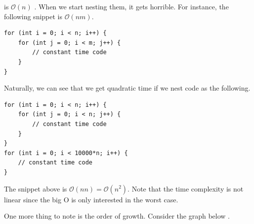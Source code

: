 \documentclass[../../../main.tex]{subfiles}
\begin{document}
is $\mathcal{O}(n)$ \cite{CS02-2}. When we start nesting them,
it gets horrible. For instance, the following snippet is
$\mathcal{O}(nm)$.

\begin{basicbox}
\begin{lstlisting}[style=cppstyle]
for (int i = 0; i < n; i++) {
    for (int j = 0; i < m; j++) {
        // constant time code
    }
}
\end{lstlisting}
\end{basicbox}

Naturally, we can see that we get quadratic time if we nest code
as the following.

\begin{basicbox}
\begin{lstlisting}[style=cppstyle]
for (int i = 0; i < n; i++) {
    for (int j = 0; i < n; j++) {
        // constant time code
    }
}
for (int i = 0; i < 10000*n; i++) {
    // constant time code
}
\end{lstlisting}
\end{basicbox}

The snippet above is $\mathcal{O}(nn) = \mathcal{O}(n^2)$. Note that
the time complexity is not linear since the big O is only interested
in the worst case.

One more thing to note is the order of growth. Consider the graph
below \cite{CS02-8}.

\begin{figure}[H]
\centering
{}
\end{figure}
\end{document}
